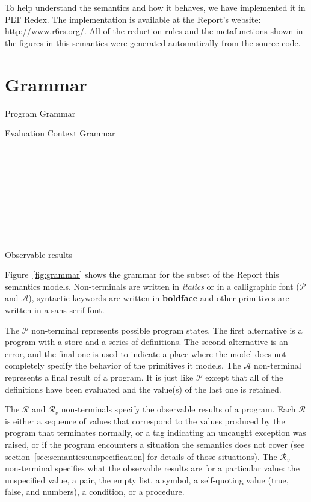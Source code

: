 To help understand the semantics and how it behaves, we have
implemented it in PLT Redex. The implementation is available at the
Report's website: \url{http://www.r6rs.org/}. All of the reduction
rules and the metafunctions shown in the figures in this semantics
were generated automatically from the source code.



\section{Grammar}\label{sec:semantics:grammar}

\beginfig

\caption{Program Grammar}\label{fig:grammar}
\endfig

\beginfig

\caption{Evaluation Context Grammar}\label{fig:ec-grammar}
\endfig

\beginfig
\begin{center}
\parbox{3.6in}{

~

~

~

~

~
}
\parbox{2.4in}{}
\end{center}
\caption{Observable results}\label{fig:observable}
\endfig


Figure~\ref{fig:grammar} shows the grammar for the subset of the
Report this semantics models. Non-terminals are written in
\textit{italics} or in a calligraphic font ($\mathcal{P}$ and
$\mathcal{A}$), syntactic keywords are written in \textbf{boldface} and
other primitives are written in a \textsf{sans-serif} font.

The $\mathcal{P}$ non-terminal represents possible program states. The
first alternative is a program with a store and a series of
definitions. The second alternative is an error, and the final one is
used to indicate a place where the model does not completely specify
the behavior of the primitives it models. The $\mathcal{A}$ non-terminal
represents a final result of a program. It is just like $\mathcal{P}$
except that all of the definitions have been evaluated and the
value(s) of the last one is retained.

The $\mathcal{R}$ and $\mathcal{R}_v$ non-terminals specify the observable results of a program. Each $\mathcal{R}$ is either a sequence of values that correspond to the values produced by the program that terminates normally, or a tag indicating an uncaught exception was raised, or  if the program encounters a situation the semantics does not cover (see section~\ref{sec:semantics:unspecification} for details of those situations). The $\mathcal{R}_v$ non-terminal specifies what the observable results are for a particular value: the unspecified value, a pair, the empty list, a symbol, a self-quoting value (true, false, and numbers), a condition, or a procedure.

